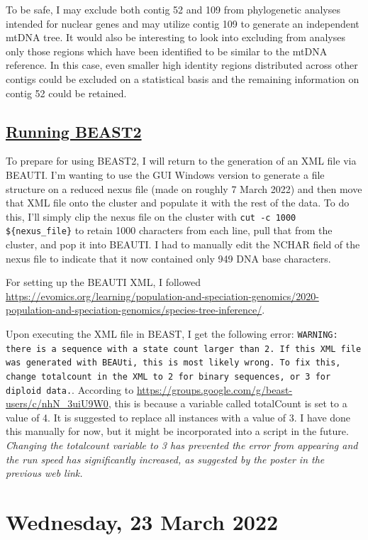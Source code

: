 \documentclass[12pt]{report}
\begin{document}
To be safe, I may exclude both contig 52 and 109 from phylogenetic analyses intended for nuclear genes and may utilize contig 109 to generate an independent mtDNA tree. It would also be interesting to look into excluding from analyses only those regions which have been identified to be similar to the mtDNA reference. In this case, even smaller high identity regions distributed across other contigs could be excluded on a statistical basis and the remaining information on contig 52 could be retained.

\subsection*{\underline{Running BEAST2}}

To prepare for using BEAST2, I will return to the generation of  an XML file via BEAUTI. I'm wanting to use the GUI Windows version to generate a file structure on a reduced nexus file (made on roughly 7 March 2022) and then move that XML file onto the cluster and populate it with the rest of the data. To do this, I'll simply clip the nexus file on the cluster with \verb!cut -c 1000 ${nexus_file}! to retain 1000 characters from each line, pull that from the cluster, and pop it into BEAUTI. I had to manually edit the NCHAR field of the nexus file to indicate that it now contained only 949 DNA base characters.

For setting up the BEAUTI XML, I followed \url{https://evomics.org/learning/population-and-speciation-genomics/2020-population-and-speciation-genomics/species-tree-inference/}.

Upon executing the XML file in BEAST, I get the following error: \texttt{WARNING: there is a sequence with a state count larger than 2. If this XML file was generated with BEAUti, this is most likely wrong. To fix this, change totalcount in the XML to 2 for binary sequences, or 3 for diploid data.}. According to \url{https://groups.google.com/g/beast-users/c/nhN_3uiU9W0}, this is because a variable called totalCount is set to a value of 4. It is suggested to replace all instances with a value of 3. I have done this manually for now, but it might be incorporated into a script in the future. \emph{Changing the totalcount variable to 3 has prevented the error from appearing and the run speed has significantly increased, as suggested by the poster in the previous web link.}

\section*{Wednesday, 23 March 2022}
\end{document}
